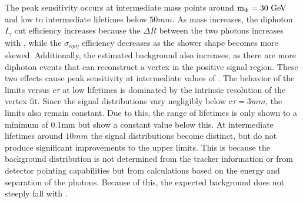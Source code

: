 The peak sensitivity occurs at intermediate mass points around $\mphi=30\unit{GeV}$ and low to intermediate lifetimes below $50\unit{mm}$. As mass increases, the diphoton $I_\gamma$ cut efficiency increases because the $\Delta R$ between the two photons increases with \mphi, while the $\sigma_{i\eta i\eta}$ efficiency decreases as the shower shape becomes more skewed. Additionally, the estimated background also increases, as there are more diphoton events that can reconstruct a vertex in the positive \lxy signal region. These two effects cause peak sensitivity at intermediate values of \mphi. The behavior of the limits versus c$\tau$ at low lifetimes is dominated by the intrinsic resolution of the vertex fit. Since the signal distributions vary negligibly below c$\tau=3\unit{mm}$, the limits also remain constant. Due to this, the range of lifetimes is only shown to a minimum of 0.1\unit{mm} but show a constant value below this. At intermediate lifetimes around $10\unit{mm}$ the signal distributions become distinct, but do not produce significant improvements to the upper limits. This is because the background distribution \lxy is not determined from the tracker information or from detector pointing capabilities but from calculations based on the energy and separation of the photons. Because of this, the expected background does not steeply fall with \lxy.

